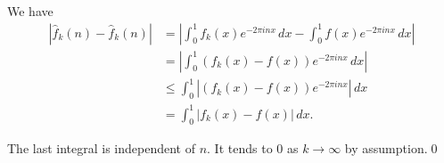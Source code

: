 \documentclass[oneside]{article}
\newcommand\abs[1]{\left|#1\right|}
\begin{document}
  We have\begin{align*}
    \abs{\hat{f}_k(n) - \hat{f}_k(n)}
    &= \abs{\int_0^1f_k(x)e^{-2\pi inx}\,dx - \int_0^1f(x)e^{-2\pi inx}\,dx} \\
    &= \abs{\int_0^1\left(f_k(x) - f(x)\right)e^{-2\pi inx}\,dx} \\
    &\leq \int_0^1\abs{\left(f_k(x) - f(x)\right)e^{-2\pi inx}}\,dx \\
    &= \int_0^1\abs{f_k(x) - f(x)}\,dx \text{.}
  \end{align*}

  The last integral is independent of $n$. It tends to $0$ as $k \to \infty$ by
  assumption.\qed
\end{document}
